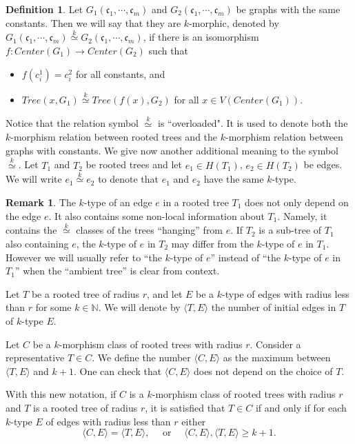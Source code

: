 \documentclass[11pt,notitlepage]{report}
\theoremstyle{definition}
\newtheorem{definition}{Definition}[chapter]
\newtheorem{remark}{Remark}[chapter]
\newcommand{\N}{\mathbb{N}}
\newcommand{\clist}{\mathfrak{c}_{1}, \cdots, \mathfrak{c}_m}
\newcommand{\morph}[1]{\stackrel{#1}{\simeq}}
\begin{document}
\begin{definition} 
	Let $G_1(\clist)$ and $G_2(\clist)$ be graphs with the same constants. 
	Then we
	will say that they are $k$-morphic, denoted by $G_1(\clist)\morph{k}G_2(\clist)$, if there is an isomorphism
	$f:Center(G_1)\rightarrow Center(G_2)$ such that
	\begin{itemize}
		\item $f(c^1_i)=c^2_i$ for all constants, and
		\item $Tree(x,G_1)\morph{k} Tree(f(x),G_2)$ for all $x\in V(Center(G_1))$.
	\end{itemize}
\end{definition}


Notice that the relation symbol $\morph{k}$ is ``overloaded". 
It is used to denote
both the $k$-morphism relation between rooted 
trees and the $k$-morphism relation
between graphs with constants. We give now another additional
meaning to the symbol $\morph{k}$. 
Let $T_1$ and $T_2$ be rooted trees
and let $e_1\in H(T_1)$, $e_2\in H(T_2)$ be edges. We will 
write $e_1\morph{k} e_2$ to denote that $e_1$ and $e_2$ have
the same $k$-type.


\begin{remark}
	The $k$-type of an edge $e$ in a rooted tree $T_1$
	does not only depend on the edge $e$. It also contains some 
	non-local information about $T_1$. Namely, it contains the 
	$\morph{k}$ classes of the trees ``hanging'' from $e$.
	If $T_2$ is a sub-tree of $T_1$ also containing $e$, the $k$-type
	of $e$ in $T_2$ may differ from the $k$-type of $e$ in $T_1$.
	However we will usually refer to ``the $k$-type of $e$'' instead of
	``the $k$-type of $e$ in $T_1$'' when the ``ambient tree'' is clear
	from context.   
\end{remark}

Let $T$ be a rooted tree of radius $r$, and let $E$ be a $k$-type of edges with radius less than $r$ for some $k\in \N$. We will denote by $\langle T,E \rangle$
the number of initial edges in $T$ of $k$-type $E$. \par
Let $C$ be a $k$-morphism class of rooted trees with radius $r$. 
Consider
a representative $T\in C$. We define the number $\langle C, E \rangle$ 
as the maximum between $\langle T, E\rangle$ and $k+1$. One can check that 
$\langle C, E\rangle$ does not depend on the choice of $T$.\par

With this new notation, if $C$ is a $k$-morphism class of rooted
trees with radius $r$ and $T$ is a rooted tree of radius $r$, it
is satisfied that $T\in C$ if and only if for each $k$-type $E$ of edges 
with radius less than $r$ either
\[ \langle C,E \rangle=\langle T,E \rangle, \quad \text{ or } \quad
\langle C,E \rangle,
\langle T,E \rangle \geq k+1 .\]
 
\end{document}
